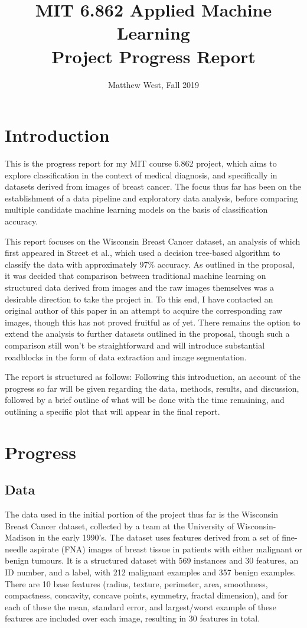 \documentclass[11pt]{article}
\title{MIT 6.862 Applied Machine Learning \\ Project Progress Report}
\author{Matthew West, Fall 2019}
\begin{document}
\date{}
\maketitle

\section{Introduction}
This is the progress report for my MIT course 6.862 project, which aims to explore classification in the context of medical diagnosis, and specifically in datasets derived from images of breast cancer. The focus thus far has been on the establishment of a data pipeline and exploratory data analysis, before comparing multiple candidate machine learning models on the basis of classification accuracy.

This report focuses on the Wisconsin Breast Cancer dataset, \cite{Dua:2019} an analysis of which first appeared in Street et al., which used a decision tree-based algorithm to classify the data with approximately 97\% accuracy. \cite{street1993nuclear, mangasarian1993mathematical} As outlined in the proposal, it was decided that comparison between traditional machine learning on structured data derived from images and the raw images themselves was a desirable direction to take the project in. To this end, I have contacted an original author of this paper in an attempt to acquire the corresponding raw images, though this has not proved fruitful as of yet. There remains the option to extend the analysis to further datasets outlined in the proposal, though such a comparison still won't be straightforward and will introduce substantial roadblocks in the form of data extraction and image segmentation. 

The report is structured as follows: Following this introduction, an account of the progress so far will be given regarding the data, methods, results, and discussion, followed by a brief outline of what will be done with the time remaining, and outlining a specific plot that will appear in the final report.

\section{Progress}
\subsection{Data}
The data used in the initial portion of the project thus far is the Wisconsin Breast Cancer dataset, collected by a team at the University of Wisconsin-Madison in the early 1990's. The dataset uses features derived from a set of fine-needle aspirate (FNA) images of breast tissue in patients with either malignant or benign tumours. It is a structured dataset with 569 instances and 30 features, an ID number, and a label, with 212 malignant examples and 357 benign examples. There are 10 base features (radius, texture, perimeter, area, smoothness, compactness, concavity, concave points, symmetry, fractal dimension), and for each of these the mean, standard error, and largest/worst example of these features are included over each image, resulting in 30 features in total. 
\end{document}
